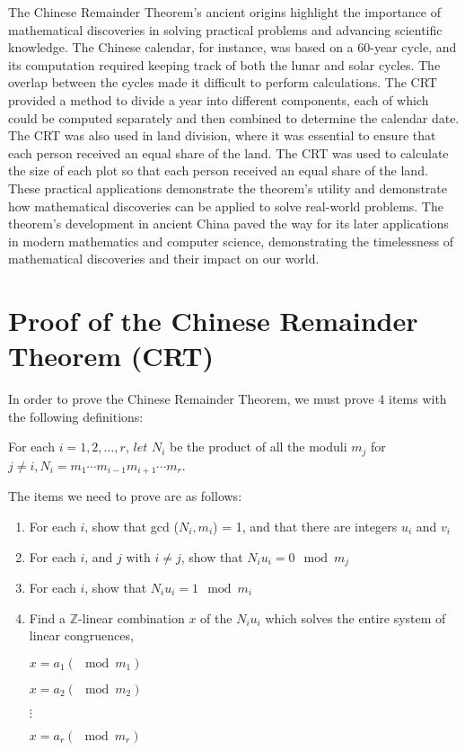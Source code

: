 \documentclass[12pt]{article}
\begin{document}
The Chinese Remainder Theorem's ancient origins highlight the importance of 
mathematical discoveries in solving practical problems and advancing 
scientific knowledge. The Chinese calendar, for instance, was based on a 
60-year cycle, and its computation required keeping track of both the lunar 
and solar cycles. The overlap between the cycles made it difficult to 
perform calculations. The CRT provided a method to divide a year into 
different components, each of which could be computed separately and 
then combined to determine the calendar date. The CRT was also used in 
land division, where it was essential to ensure that each person received 
an equal share of the land. The CRT was used to calculate the size of each 
plot so that each person received an equal share of the land. These 
practical applications demonstrate the theorem's utility and demonstrate 
how mathematical discoveries can be applied to solve real-world problems. 
The theorem's development in ancient China paved the way for its later 
applications in modern mathematics and computer science, demonstrating 
the timelessness of mathematical discoveries and their impact on our world.


\section*{Proof of the Chinese Remainder Theorem (CRT)}

In order to prove the Chinese Remainder Theorem, we must prove 4 items 
with the following definitions:

\begin{addmargin}[1cm]{1cm}
    For each $i = 1, 2, \ldots, r$, $let$ $N_i$ be the 
    product of all the moduli $m_j$ for $j \neq i, N_i = m_1 \cdots 
    m_{i-1}m_{i+1}\cdots m_r$.
\end{addmargin}

The items we need to prove are as follows:
\begin{enumerate}
    \item For each $i$, show that gcd ($N_i, m_i$) = 1, and that there are integers $u_i$ and $v_i$
    \item For each $i$, and $j$ with $i\neq j$, show that $N_i u_i = 0 \mod m_j$
    \item For each $i$, show that $N_i u_i = 1 \mod m_i$
    \item Find a $\mathbb{Z}$-linear combination $x$ of the $N_i u_i$ which solves the entire system of linear congruences,
    \begin{center}
        $x = a_1 (\mod m_1)$

        $x = a_2 (\mod m_2)$

        $\vdots$

        $x = a_r (\mod m_r)$
    \end{center}
\end{enumerate}
\end{document}
